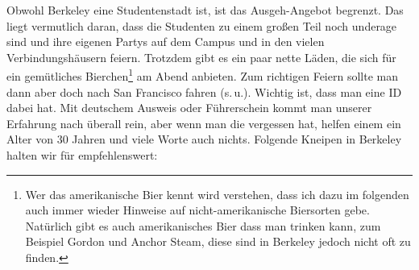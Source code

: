 \documentclass[a4paper]{scrreprt}
\begin{document}
Obwohl Berkeley eine Studentenstadt ist, ist das Ausgeh-Angebot begrenzt. Das liegt vermutlich daran, dass die Studenten zu einem großen Teil noch underage sind und ihre eigenen Partys auf dem Campus und in den vielen Verbindungshäusern feiern. Trotzdem gibt es ein paar nette Läden, die sich für ein gemütliches Bierchen\footnote{Wer das amerikanische Bier kennt wird verstehen, dass ich dazu im folgenden auch immer wieder Hinweise auf nicht-amerikanische Biersorten gebe. Natürlich gibt es auch amerikanisches Bier dass man trinken kann, zum Beispiel Gordon und Anchor Steam, diese sind in Berkeley jedoch nicht oft zu finden.} am Abend anbieten.  Zum richtigen Feiern sollte man dann aber doch nach San Francisco fahren (s.\,u.). Wichtig ist, dass man eine ID dabei hat. Mit deutschem Ausweis oder Führerschein kommt man unserer Erfahrung nach überall rein, aber wenn man die vergessen hat, helfen einem ein Alter von 30 Jahren und viele Worte auch nichts. Folgende Kneipen in Berkeley halten wir für empfehlenswert:
\end{document}

